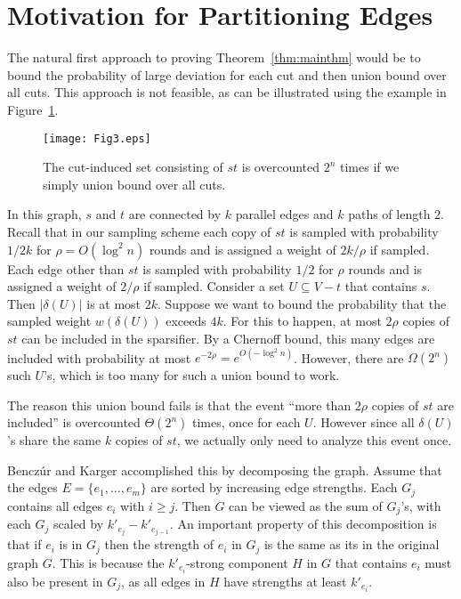 \documentclass[11pt]{article}
\numberwithin{equation}{section}
\newcommand{\AppendixName}[1]{\label{app:#1}}
\newcommand{\FigureName}[1]{\label{fig:#1}}
\newcommand{\Figure}[1]{Figure~\ref{fig:#1}}
\newcommand{\Theorem}[1]{Theorem~\ref{thm:#1}}
\begin{document}
\section{Motivation for Partitioning Edges}
\AppendixName{partitioning}

The natural first approach to proving \Theorem{mainthm}
would be to bound the probability of large deviation for each cut
and then union bound over all cuts.
This approach is not feasible, as can be illustrated using the example in \Figure{example3}.

\begin{figure}
	\centering
    \texttt{[image: Fig3.eps]}
	\caption{The cut-induced set consisting of $st$ is overcounted $2^n$ times if we simply union
    bound over all cuts.}
	\FigureName{example3}
\end{figure}

In this graph, $s$ and $t$ are connected by $k$ parallel edges
and $k$ paths of length $2$.
Recall that in our sampling scheme 
each copy of $st$ is sampled with probability $1/2k$
for $\rho=O(\log^2n)$ rounds and is assigned a weight of $2k/\rho$ if sampled.
Each edge other than $st$ is sampled with probability $1/2$
for $\rho$ rounds and is assigned a weight of $2/\rho$ if sampled.
Consider a set $U\subseteq V-t$ that contains $s$.
Then $|\delta(U)|$ is at most $2k$.
Suppose we want to bound the probability that
the sampled weight $w(\delta(U))$ exceeds $4k$.
For this to happen, at most $2\rho$ copies of $st$
can be included in the sparsifier.
By a Chernoff bound, this many edges are included 
with probability at most $e^{-2\rho}=e^{O(-\log^2n)}$.
However, there are $\Omega(2^n)$ such $U$'s,
which is too many for such a union bound to work.

The reason this union bound fails
is that the event ``more than $2\rho$ copies of $st$ are included''
is overcounted $\Theta(2^n)$ times, once for each $U$.
However since all $\delta(U)$'s share the same $k$ copies of $st$,
we actually only need to analyze this event once.

Bencz\'ur and Karger \cite{BK} accomplished this by decomposing the graph.
Assume that the edges $E=\{e_1,\ldots,e_m\}$ are sorted by increasing edge strengths.
Each $G_j$ contains all edges $e_i$ with $i\ge j$.
Then $G$ can be viewed as the sum of $G_j$'s,
with each $G_j$ scaled by $k'_{e_j}-k'_{e_{j-1}}$.
An important property of this decomposition is that
if $e_i$ is in $G_j$ 
then the strength of $e_i$ in $G_j$ is the same as
its in the original graph $G$. 
This is because the $k'_{e_i}$-strong component $H$ in $G$ that contains $e_i$
must also be present in $G_j$, as all edges in $H$ have strengths at least $k'_{e_i}$.
\end{document}

